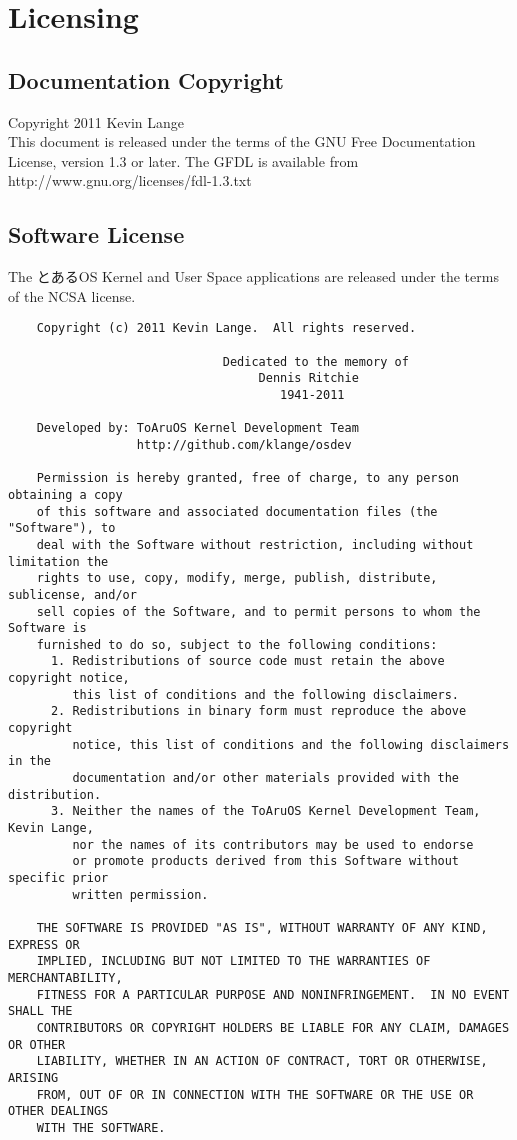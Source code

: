 \section{Licensing}

\subsection{Documentation Copyright}

Copyright 2011 Kevin Lange \\
This document is released under the terms of the GNU Free Documentation License, version 1.3 or later.
The GFDL is available from http://www.gnu.org/licenses/fdl-1.3.txt


\subsection{Software License}

The とあるOS Kernel and User Space applications are released under the terms of the NCSA license.

\begin{verbatim}
    Copyright (c) 2011 Kevin Lange.  All rights reserved.

                              Dedicated to the memory of
                                   Dennis Ritchie
                                      1941-2011

    Developed by: ToAruOS Kernel Development Team
                  http://github.com/klange/osdev

    Permission is hereby granted, free of charge, to any person obtaining a copy
    of this software and associated documentation files (the "Software"), to
    deal with the Software without restriction, including without limitation the
    rights to use, copy, modify, merge, publish, distribute, sublicense, and/or
    sell copies of the Software, and to permit persons to whom the Software is
    furnished to do so, subject to the following conditions:
      1. Redistributions of source code must retain the above copyright notice,
         this list of conditions and the following disclaimers.
      2. Redistributions in binary form must reproduce the above copyright
         notice, this list of conditions and the following disclaimers in the
         documentation and/or other materials provided with the distribution.
      3. Neither the names of the ToAruOS Kernel Development Team, Kevin Lange,
         nor the names of its contributors may be used to endorse
         or promote products derived from this Software without specific prior
         written permission.

    THE SOFTWARE IS PROVIDED "AS IS", WITHOUT WARRANTY OF ANY KIND, EXPRESS OR
    IMPLIED, INCLUDING BUT NOT LIMITED TO THE WARRANTIES OF MERCHANTABILITY,
    FITNESS FOR A PARTICULAR PURPOSE AND NONINFRINGEMENT.  IN NO EVENT SHALL THE
    CONTRIBUTORS OR COPYRIGHT HOLDERS BE LIABLE FOR ANY CLAIM, DAMAGES OR OTHER
    LIABILITY, WHETHER IN AN ACTION OF CONTRACT, TORT OR OTHERWISE, ARISING
    FROM, OUT OF OR IN CONNECTION WITH THE SOFTWARE OR THE USE OR OTHER DEALINGS
    WITH THE SOFTWARE.
\end{verbatim}
